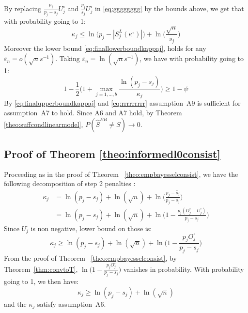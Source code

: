 \documentclass[aos]{imsart}
\theoremstyle{plain}
\begin{document}
By replacing $\frac{p_j}{p_j-s_j}U^{\circ}_j$ and $\frac{p_j}{s_j}U^{\circ}_j$ in \eqref{eq:gggggggg} by the bounds above, we get that  with probability going to 1:
\begin{equation}\label{eq:finalupperboundkappaj}
  \kappa_j \leq \ln\big(p_j-|S^L_j(\kappa^{\circ})|\big)+\ln\Big(\frac{\sqrt{n}}{s_j}\Big)
\end{equation}
Moreover the lower bound \eqref{eq:finallowerboundkappaj}, holds for any $\varepsilon_n=o(\sqrt{n}s^{-1})$. Taking $\varepsilon_n=\ln(\sqrt{n}s^{-1})$, we have with probability going to 1:
\begin{equation}\label{eq:rrrrrrrrr}
    1-\frac12\Big(1+\max_{j=1, \ldots,b}\frac{\ln(p_j-s_j)}{\kappa_j}\Big) \geq 1-\psi
\end{equation}
By \eqref{eq:finalupperboundkappaj} and \eqref{eq:rrrrrrrrr} assumption~A9 is sufficient for assumption~A7 to hold. Since A6 and A7 hold, by Theorem \ref{theo:suffcondlinearmodel}, $P(\hat{S}^{EB}\neq S) \to 0$.

\subsection{Proof of Theorem \ref{theo:informedl0consist}}
Proceeding as in the proof of Theorem ~\ref{theo:empbayesselconsist}, we have the following decomposition of step 2 penalties :
\begin{align*}
    \kappa_j
    &= \ln(p_j-s_j) + \ln(\sqrt{n}) + \ln\Big(\frac{p_j-\widehat{s}_j}{p_j-s_j}\Big)  \nonumber\\
    &= \ln(p_j-s_j)+\ln(\sqrt{n})+\ln\Big(1-\frac{p_j(O^{\circ}_j-U^{\circ}_j)}{p_j-s_j}\Big)
\end{align*}
Since $U_j^{\circ}$ is non negative, lower bound on those is:
\begin{equation*}
    \kappa_j
    \geq  \ln(p_j-s_j)+\ln(\sqrt{n})+\ln\Big(1-\frac{p_j O^{\circ}_j}{p_j-s_j}\Big)
\end{equation*}
From the proof of Theorem ~\ref{theo:empbayesselconsist}, by Theorem~\ref{thm:convtoT}, $\ln\Big(1-\frac{p_j O^{\circ}_j}{p_j-s_j}\Big)$ vanishes in probability. With probability going to 1, we then have:
\begin{equation}\label{eq:finallowerboundkappaj2}\kappa_j 
    \geq  \ln(p_j-s_j)+\ln(\sqrt{n})
\end{equation}
and the $\kappa_j$ satisfy assumption~A6.
\end{document}
